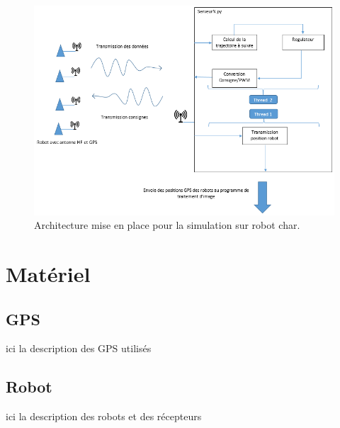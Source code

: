 \documentclass[10pt,a4paper]{report}
\begin{document}
\begin{figure}[ht]
\centering
    \includegraphics[scale=0.8,angle=0]{SyntheseExp.png}
    \caption{Architecture mise en place pour la simulation sur robot char.}
    \label{fig:SyntheseExp}
\end{figure}

\bigskip

\section{Matériel}
\subsection{GPS}
ici la description des GPS utilisés
\subsection{Robot}
ici la description des robots et des récepteurs
\end{document}
